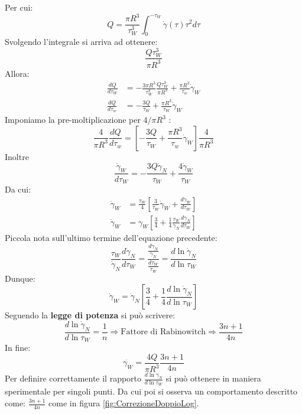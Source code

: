 Per cui:
\begin{equation}
Q = \frac{\pi R^3}{\tau_W^3}\int_0^{-\tau_W}{\dot{\gamma}(\tau)\tau^2 d\tau}
\end{equation}
Svolgendo l'integrale si arriva ad ottenere:
\begin{equation}
\frac{Q \tau_W^3}{\pi R^3}
\end{equation}
Allora:
\begin{equation}
\begin{split}
\frac{dQ}{d\tau_W} &= - \frac{3\pi R^3}{\tau_W^4} \frac{Q \tau_W^3}{\pi R^3} + \frac{\pi R^3}{\tau_w}\dot{\gamma}_W\\
\frac{dQ}{d\tau_w} &= -\frac{3Q}{\tau_W} + \frac{\pi R^3}{\tau_W}\dot{\gamma}_W
\end{split}
\end{equation}
Imponiamo la pre-moltiplicazione per $4/\pi R^3$ :
\begin{equation}
\frac{4}{\pi R^3}\frac{dQ}{d\tau_w} = \left[-\frac{3Q}{\tau_W}+\frac{\pi R^3}{\tau_w}\dot{\gamma}_W\right]\frac{4}{\pi R^3}
\end{equation}
Inoltre
\begin{equation}
\frac{\dot{\gamma}_W}{d\tau_W} = -\frac{3 Q \dot{\gamma}_N}{\tau_W} + \frac{4 \dot{\gamma}_W}{\tau_W}
\end{equation}
Da cui:
\begin{equation}
\begin{split}
\dot{\gamma}_W &= \frac{\tau_W}{4}\left[\frac{3}{\tau_W}\dot{\gamma}_W + \frac{d\dot{\gamma}_W}{d\tau_W}\right]\\
\dot{\gamma}_W &= \gamma_W \left[\frac{3}{4} + \frac{1}{4}\frac{\tau_W}{\dot{\gamma}_N}\frac{d\dot{\gamma}_N}{d\tau_W}\right]
\end{split}
\end{equation}
Piccola nota sull'ultimo termine dell'equazione precedente:
\begin{equation}
\frac{\tau_W}{\dot{\gamma}_N} \frac{d\dot{\gamma}_N}{d\tau_W} = \frac{\frac{d\dot{\gamma}_N}{\dot{\gamma}_N}}{\frac{d\tau_W}{\tau_W}} = \frac{d \ln\dot{\gamma}_N}{d\ln\tau_W}
\end{equation}
Dunque:
\begin{equation}
\dot{\gamma}_W = \dot{\gamma}_N\left[\frac{3}{4} + \frac{1}{4} \frac{d \ln\dot{\gamma}_N}{d\ln\tau_W}\right]
\end{equation}
Seguendo la \textbf{legge di potenza} si può scrivere:
\begin{equation}
\frac{d \ln\dot{\gamma}_N}{d\ln\tau_W} = \frac{1}{n} \Rightarrow \text{Fattore di Rabinowitch} \Rightarrow \frac{3n+1}{4n}
\end{equation}
In fine:
\begin{equation}
\dot{\gamma_W} = \frac{4Q}{\pi R^3}\frac{3n+1}{4n}
\end{equation}
Per definire correttamente il rapporto $\frac{d \ln\dot{\gamma}_N}{d\ln\tau_W}$ si può ottenere in maniera sperimentale per singoli punti. Da cui poi si osserva un comportamento descritto come: $\frac{3n+1}{4n}$ come in figura \ref{fig:CorrezioneDoppioLog}.

